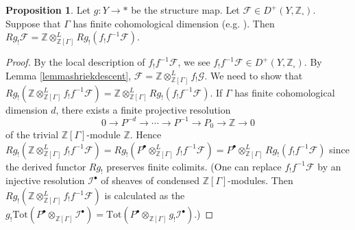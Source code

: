 \documentclass{article}
\theoremstyle{definition}
\newtheorem{proposition}[theorem]{Proposition}
\def\sF{{\mathscr{F}}}
\def\sG{{\mathscr{G}}}
\def\sI{{\mathscr{I}}}
\def\bbZ{\mathbb{Z}}
\begin{document}
\begin{proposition}\label{prop:Gammaequivariantpushforward}
	Let $g:Y\rightarrow *$ be the structure map. Let $\sF\in D^+(Y,\bbZ_{\square})$. Suppose that $\Gamma$ has finite cohomological dimension (e.g. \cite[\S 6.1]{borel1976cohomologie}). Then $Rg_!\sF=\bbZ\otimes^L_{\bbZ[\Gamma]}Rg_!(f_!f^{-1}\sF).$
\end{proposition}
\begin{proof}
	By the local description of $f_!f^{-1}\sF$, we see $f_!f^{-1}\sF\in D^+(Y,\bbZ_{\square})$. By Lemma \ref{lemmashriekdescent}, $\sF=\bbZ\otimes^L_{\bbZ[\Gamma]}f_!\sG$. We need to show that $Rg_!(\bbZ\otimes^L_{\bbZ[\Gamma]}f_!f^{-1}\sF)=\bbZ\otimes^L_{\bbZ[\Gamma]}Rg_!(f_!f^{-1}\sF)$. If $\Gamma$ has finite cohomological dimension $d$, there exists a finite projective resolution 
	\[0\rightarrow P^{-d}\rightarrow\cdots\rightarrow P^{-1}\rightarrow P_0\rightarrow \bbZ\rightarrow 0\]
	of the trivial $\bbZ[\Gamma]$-module $\bbZ$. Hence $Rg_!(\bbZ\otimes^L_{\bbZ[\Gamma]}f_!f^{-1}\sF)=Rg_!(P^{\bullet}\otimes^L_{\bbZ[\Gamma]}f_!f^{-1}\sF)=P^{\bullet}\otimes^L_{\bbZ[\Gamma]}Rg_!(f_!f^{-1}\sF)$ since the derived functor $Rg_!$ preserves finite colimits. (One can replace $f_!f^{-1}\sF$ by an injective resolution $\sI^{\bullet}$ of sheaves of condensed $\bbZ[\Gamma]$-modules. Then $Rg_!(\bbZ\otimes^L_{\bbZ[\Gamma]}f_!f^{-1}\sF)$ is calculated as the $g_!\mathrm{Tot}(P^{\bullet}\otimes_{\bbZ[\Gamma]}\sI^{\bullet})=\mathrm{Tot}(P^{\bullet}\otimes_{\bbZ[\Gamma]}g_!\sI^{\bullet})$.)
\end{proof}
\end{document}
